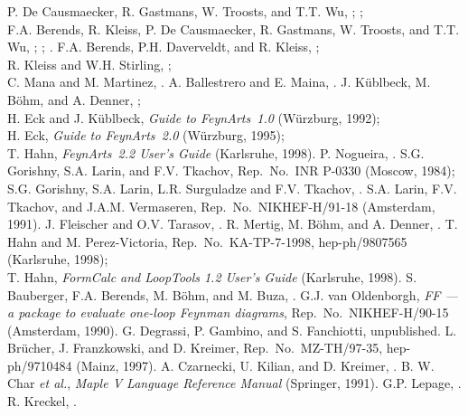  P. De Causmaecker, R. Gastmans, W. Troosts, and T.T.
  Wu, ; ;\\ F.A. Berends, R.
  Kleiss, P. De Causmaecker, R. Gastmans, W. Troosts, and T.T. Wu,
  ; ; .
  F.A. Berends, P.H. Daverveldt, and R. Kleiss, ;\\
  R. Kleiss and W.H. Stirling, ;\\
  C. Mana and M. Martinez, .
  A. Ballestrero and E. Maina, .
  J. K\"ublbeck, M. B\"ohm, and A. Denner,
  ;\\
  H. Eck and J. K\"ublbeck, {\it Guide to FeynArts~1.0} (W\"urzburg, 1992);\\
  H. Eck, {\it Guide to FeynArts~2.0} (W\"urzburg, 1995);\\
  T. Hahn, {\it FeynArts~2.2 User's Guide} (Karlsruhe, 1998).
 P. Nogueira, .
  S.G. Gorishny, S.A. Larin, and F.V. Tkachov,
  Rep.~No.~INR P-0330 (Moscow, 1984);\\
  S.G. Gorishny, S.A. Larin,
  L.R. Surguladze and F.V. Tkachov, .
  S.A. Larin, F.V. Tkachov, and J.A.M. Vermaseren,
  Rep.~No.~NIKHEF-H/91-18 (Amsterdam, 1991).
  J. Fleischer and O.V. Tarasov, .
  R. Mertig, M. B\"ohm, and A. Denner, .
  T. Hahn and M. Perez-Victoria, Rep.~No.~KA-TP-7-1998,
  hep-ph/9807565 (Karlsruhe, 1998);\\ 
  T. Hahn, {\it FormCalc and LoopTools 1.2 User's Guide} (Karlsruhe, 1998).
  S. Bauberger, F.A. Berends, M. B\"ohm, and M. Buza, .
  G.J. van Oldenborgh, {\it FF --- a package to evaluate one-loop Feynman
  diagrams}, Rep.~No.~NIKHEF-H/90-15 (Amsterdam, 1990).
  G. Degrassi, P. Gambino, and S. Fanchiotti, unpublished.
  L. Br\"ucher, J. Franzkowski, and D. Kreimer, Rep.~No.~MZ-TH/97-35,
  hep-ph/9710484 (Mainz, 1997).
  A. Czarnecki, U. Kilian, and D. Kreimer, .
  B. W. Char {\it et al.}, {\it Maple V Language Reference Manual}
    (Springer, 1991).
  G.P. Lepage, .
   R. Kreckel, .
